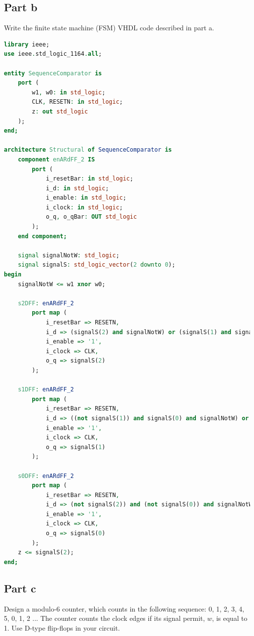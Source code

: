 \documentclass[12pt, a4paper]{article}
\begin{document}
	\subsection*{Part b}
	Write the finite state machine (FSM) VHDL code described in part a.
	
	\begin{lstlisting}[language=vhdl]
library ieee;
use ieee.std_logic_1164.all;

entity SequenceComparator is
    port (
        w1, w0: in std_logic;
        CLK, RESETN: in std_logic;
        z: out std_logic
    );
end;

architecture Structural of SequenceComparator is
    component enARdFF_2 IS
        port (
            i_resetBar: in std_logic;
            i_d: in std_logic;
            i_enable: in std_logic;
            i_clock: in std_logic;
            o_q, o_qBar: OUT std_logic
        );
    end component;
    
    signal signalNotW: std_logic;
    signal signalS: std_logic_vector(2 downto 0);
begin
    signalNotW <= w1 xnor w0;
    
    s2DFF: enARdFF_2
        port map (
            i_resetBar => RESETN,
            i_d => (signalS(2) and signalNotW) or (signalS(1) and signalS(0) and signalNotW),
            i_enable => '1',
            i_clock => CLK,
            o_q => signalS(2)
        );
    
    s1DFF: enARdFF_2
        port map (
            i_resetBar => RESETN,
            i_d => ((not signalS(1)) and signalS(0) and signalNotW) or (signalS(1) and (not signalS(0)) and signalNotW),
            i_enable => '1',
            i_clock => CLK,
            o_q => signalS(1)
        );
    
    s0DFF: enARdFF_2
        port map (
            i_resetBar => RESETN,
            i_d => (not signalS(2)) and (not signalS(0)) and signalNotW,
            i_enable => '1',
            i_clock => CLK,
            o_q => signalS(0)
        );
    z <= signalS(2);
end;
	\end{lstlisting}
	
	\subsection*{Part c}
	Design a modulo-6 counter, which counts in the following sequence: 0, 1, 2, 3, 4, 5, 0, 1, 2 ... The counter counts the clock edges if its signal permit, $w$, is equal to 1. Use D-type flip-flops in your circuit.
	
\end{document}
